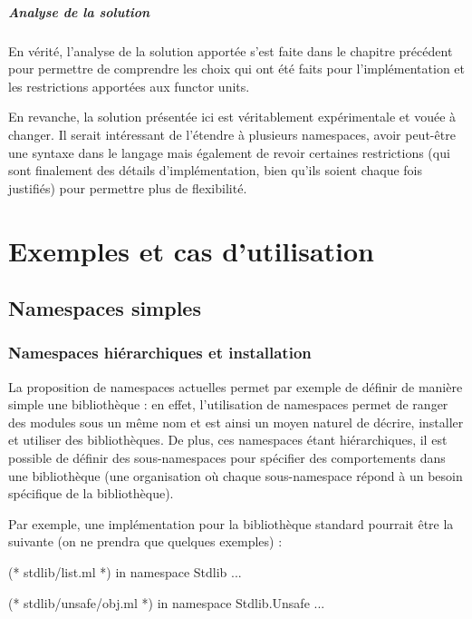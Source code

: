 \documentclass[11pt,a4paper]{report}
\begin{document}
\paragraph{Analyse de la solution}

En vérité, l'analyse de la solution apportée s'est faite dans le chapitre
précédent pour permettre de comprendre les choix qui ont été faits pour
l'implémentation et les restrictions apportées aux functor units.

En revanche, la solution présentée ici est véritablement expérimentale et vouée
à changer. Il serait intéressant de l'étendre à plusieurs namespaces, avoir
peut-être une syntaxe dans le langage mais également de revoir certaines
restrictions (qui sont finalement des détails d'implémentation, bien qu'ils
soient chaque fois justifiés) pour permettre plus de flexibilité.

\chapter{Exemples et cas d'utilisation}

\section{Namespaces simples}

\subsection{Namespaces hiérarchiques et installation}

La proposition de namespaces actuelles permet par exemple de définir de manière
simple une bibliothèque : en effet, l'utilisation de namespaces permet de ranger
des modules sous un même nom et est ainsi un moyen naturel de décrire, installer
et utiliser des bibliothèques. De plus, ces namespaces étant hiérarchiques, il
est possible de définir des sous-namespaces pour spécifier des comportements dans
une bibliothèque (une organisation où chaque sous-namespace répond à un besoin
spécifique de la bibliothèque).

Par exemple, une implémentation pour la bibliothèque standard pourrait être la
suivante (on ne prendra que quelques exemples) :
\begin{OCaml}
(* stdlib/list.ml *)
in namespace Stdlib
...
\end{OCaml}

\begin{OCaml}
(* stdlib/unsafe/obj.ml *)
in namespace Stdlib.Unsafe
...
\end{OCaml}
\end{document}
